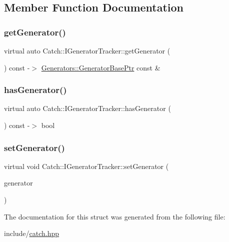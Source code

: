 \subsection{Member Function Documentation}
\mbox{\label{struct_catch_1_1_i_generator_tracker_a23be942fc51672598bfa02c678c3078a}} 
\subsubsection{\texorpdfstring{getGenerator()}{getGenerator()}}
{\footnotesize\ttfamily virtual auto Catch\+::\+I\+Generator\+Tracker\+::get\+Generator (\begin{DoxyParamCaption}{ }\end{DoxyParamCaption}) const -\/$>$  \mbox{\hyperlink{namespace_catch_1_1_generators_a1519f304113619d7d18670e2f08276c0}{Generators\+::\+Generator\+Base\+Ptr}} const \&\hspace{0.3cm}{\ttfamily [pure virtual]}}

\mbox{\label{struct_catch_1_1_i_generator_tracker_ae88084f9af27c8b9a5d5775b9c148498}} 
\subsubsection{\texorpdfstring{hasGenerator()}{hasGenerator()}}
{\footnotesize\ttfamily virtual auto Catch\+::\+I\+Generator\+Tracker\+::has\+Generator (\begin{DoxyParamCaption}{ }\end{DoxyParamCaption}) const -\/$>$  bool\hspace{0.3cm}{\ttfamily [pure virtual]}}

\mbox{\label{struct_catch_1_1_i_generator_tracker_a9945eff42219edc5a7071eebd8b0419e}} 
\subsubsection{\texorpdfstring{setGenerator()}{setGenerator()}}
{\footnotesize\ttfamily virtual void Catch\+::\+I\+Generator\+Tracker\+::set\+Generator (\begin{DoxyParamCaption}\item[{\mbox{\hyperlink{namespace_catch_1_1_generators_a1519f304113619d7d18670e2f08276c0}{Generators\+::\+Generator\+Base\+Ptr}} \&\&}]{generator }\end{DoxyParamCaption})\hspace{0.3cm}{\ttfamily [pure virtual]}}



The documentation for this struct was generated from the following file\+:\begin{DoxyCompactItemize}
\item 
include/\mbox{\hyperlink{catch_8hpp}{catch.\+hpp}}\end{DoxyCompactItemize}
